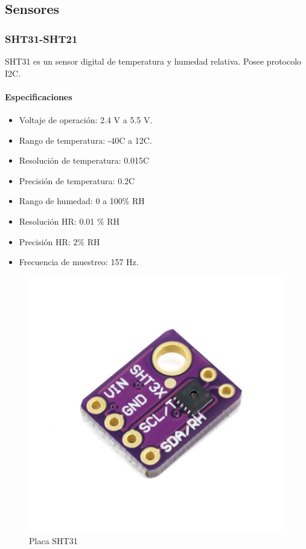 
\subsection{Sensores}
	\subsubsection{SHT31-SHT21}
	SHT31 es un sensor digital de temperatura y humedad relativa. Posee protocolo I2C.
	\paragraph*{Especificaciones}
	\begin{itemize}
		\item   Voltaje de operación: 2.4 V a 5.5 V.
		\item	Rango de temperatura: -40\grad C a 12\grad C.
		\item   Resolución de temperatura: 0.015\grad C
		\item	Precisión de temperatura: 0.2\grad C 
		\item	Rango de humedad: 0 a 100\% RH
		\item   Resolución HR: 0.01 \% RH
		\item   Precisión HR: 2\% RH
		\item Frecuencia de muestreo: 157 Hz.
	\end{itemize}
		\begin{figure}[htb]
	\centering
	\includegraphics[scale=0.35]{SHT31.png}
	\caption{Placa SHT31}
	\label{fig:SHT31}
		\end{figure}
	
